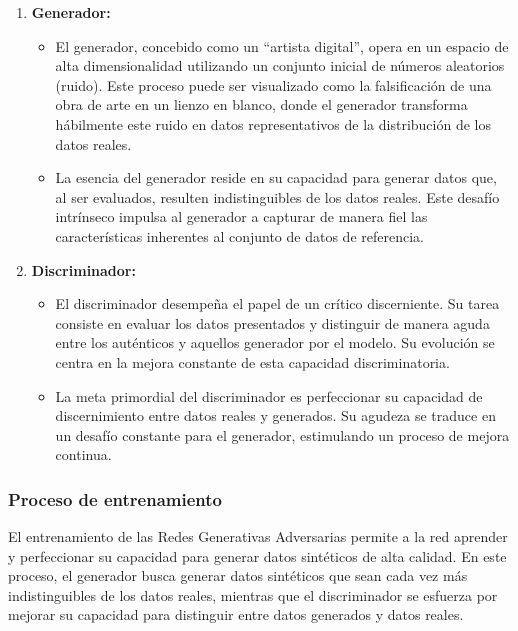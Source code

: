 \begin{enumerate}
    \item \textbf{Generador:}
    \begin{itemize}
        \item El generador, concebido como un ``artista digital'', opera en un espacio de alta dimensionalidad utilizando un conjunto inicial de números aleatorios (ruido). Este proceso puede ser visualizado como la falsificación de una obra de arte en un lienzo en blanco, donde el generador transforma hábilmente este ruido en datos representativos de la distribución de los datos reales.
        \item  La esencia del generador reside en su capacidad para generar datos que, al ser evaluados, resulten indistinguibles de los datos reales. Este desafío intrínseco impulsa al generador a capturar de manera fiel las características inherentes al conjunto de datos de referencia.
    \end{itemize}
    
    \item \textbf{Discriminador:} 
    \begin{itemize}
        \item El discriminador desempeña el papel de un crítico discerniente. Su tarea consiste en evaluar los datos presentados y distinguir de manera aguda entre los auténticos y aquellos generador por el modelo. Su evolución se centra en la mejora constante de esta capacidad discriminatoria.
        \item La meta primordial del discriminador es perfeccionar su capacidad de discernimiento entre datos reales y generados. Su agudeza se traduce en un desafío constante para el generador, estimulando un proceso de mejora continua.
    \end{itemize}
\end{enumerate}

\subsubsection{Proceso de entrenamiento}
El entrenamiento de las Redes Generativas Adversarias permite a la red aprender y perfeccionar su capacidad para generar datos sintéticos de alta calidad. En este proceso, el generador busca generar datos sintéticos que sean cada vez más indistinguibles de los datos reales, mientras que el discriminador se esfuerza por mejorar su capacidad para distinguir entre datos generados y datos reales.

